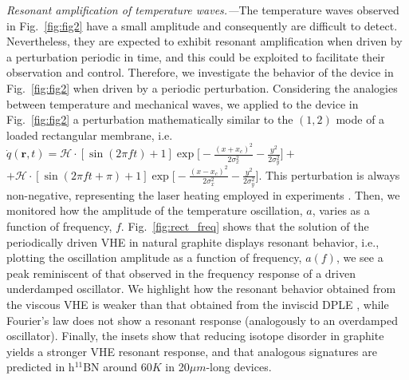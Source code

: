 \documentclass[
prb,
twocolumn,
superscriptaddress,
 amsmath,amssymb,
 aps,
longbibliography,
]{revtex4-2}
\begin{document}
\textit{Resonant amplification of temperature waves.---}The temperature waves observed in Fig.~\ref{fig:fig2} have a small amplitude and consequently are difficult to detect. Nevertheless, they are expected to exhibit resonant amplification when driven by a perturbation periodic in time, and this could be exploited to facilitate their observation and control.
Therefore, we investigate the behavior of the device in Fig.~\ref{fig:fig2} when driven by a periodic perturbation.
Considering the analogies between temperature and mechanical waves, we applied to the device in Fig.~\ref{fig:fig2} a perturbation mathematically similar to the $(1,2)$ mode of a loaded rectangular membrane, i.e. $\dot{q}(\bm{r},t){=}\mathcal{H}{\cdot} [\sin(2\pi f t){+}1] \exp\big[{-}\tfrac{(x{+}x_c)^2}{2\sigma_x^2}{-}\tfrac{y^2}{2\sigma_y^2}\big]{+}$ $ {+} \mathcal{H}{\cdot} [\sin(2\pi f t {+}\pi){+}1] \exp\big[{-}\tfrac{(x-x_c)^2}{2\sigma_x^2}{-}\tfrac{y^2}{2\sigma_y^2}\big]$.
This perturbation is always non-negative, representing the laser heating employed in experiments \cite{Huberman2019,Jeong2021,Ding2022}.
Then, we monitored how the amplitude of the temperature oscillation, $a$, varies as a function of frequency, $f$.
Fig.~\ref{fig:rect_freq} shows that the solution of the periodically driven VHE in natural graphite displays resonant behavior, i.e., plotting the oscillation amplitude as a function of frequency, $a(f)$, we see a peak reminiscent of that observed in the frequency response of a driven underdamped oscillator. We highlight how the resonant behavior obtained from the viscous VHE is weaker than that obtained from the inviscid DPLE \cite{barletta_hyperbolic_1996,xu_thermal_2002,xu_thermal_2021}, while Fourier's law does not show a resonant response (analogously to an overdamped oscillator).
Finally, the insets show that reducing isotope disorder in graphite yields a stronger VHE resonant response, and that
analogous signatures are predicted in h$^{11}$BN around $60 K$ in 20$\mu m$-long devices.
\end{document}
